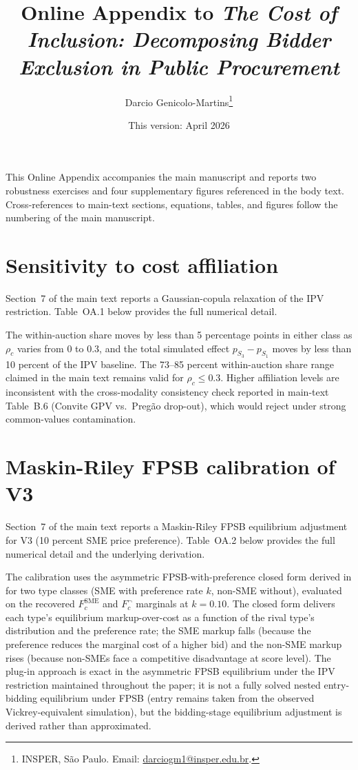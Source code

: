\documentclass[12pt]{elsarticle}
\title{\textbf{Online Appendix to \emph{The Cost of Inclusion: Decomposing Bidder Exclusion in Public Procurement}}}
\author{Darcio Genicolo-Martins\thanks{INSPER, S\~ao Paulo. Email: \href{mailto:darciogm1@insper.edu.br}{darciogm1@insper.edu.br}.}}
\date{This version: April 2026}
\begin{document}
\maketitle

\noindent This Online Appendix accompanies the main manuscript and reports two robustness exercises and four supplementary figures referenced in the body text. Cross-references to main-text sections, equations, tables, and figures follow the numbering of the main manuscript.

\section{Sensitivity to cost affiliation}\label{oa:affiliation}

Section~7 of the main text reports a Gaussian-copula relaxation of the IPV restriction. Table~OA.1 below provides the full numerical detail.



The within-auction share moves by less than 5 percentage points in either class as $\rho_c$ varies from 0 to 0.3, and the total simulated effect $p_{S_3} - p_{S_1}$ moves by less than 10 percent of the IPV baseline. The 73--85 percent within-auction share range claimed in the main text remains valid for $\rho_c \le 0.3$. Higher affiliation levels are inconsistent with the cross-modality consistency check reported in main-text Table~B.6 (Convite GPV vs.\ Preg\~ao drop-out), which would reject under strong common-values contamination.

\section{Maskin-Riley FPSB calibration of V3}\label{oa:maskinriley}

Section~7 of the main text reports a Maskin-Riley FPSB equilibrium adjustment for V3 (10 percent SME price preference). Table~OA.2 below provides the full numerical detail and the underlying derivation.



The calibration uses the asymmetric FPSB-with-preference closed form derived in \citet[Section 5]{maskinriley2000} for two type classes (SME with preference rate $k$, non-SME without), evaluated on the recovered $F_c^{\text{SME}}$ and $F_c^{\neg}$ marginals at $k = 0.10$. The closed form delivers each type's equilibrium markup-over-cost as a function of the rival type's distribution and the preference rate; the SME markup falls (because the preference reduces the marginal cost of a higher bid) and the non-SME markup rises (because non-SMEs face a competitive disadvantage at score level). The plug-in approach is exact in the asymmetric FPSB equilibrium under the IPV restriction maintained throughout the paper; it is not a fully solved nested entry-bidding equilibrium under FPSB (entry remains taken from the observed Vickrey-equivalent simulation), but the bidding-stage equilibrium adjustment is derived rather than approximated.
\end{document}
